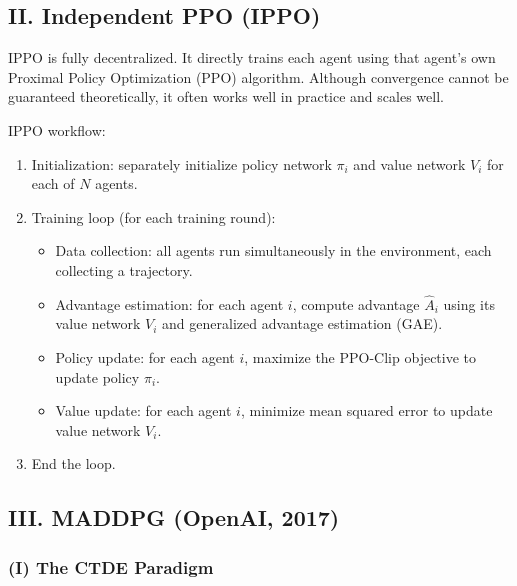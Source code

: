 \hypertarget{ii.-independent-ppo-ippo}{%
\subsection{II. Independent PPO (IPPO)}\label{ii.-independent-ppo-ippo}}

IPPO is fully decentralized. It directly trains each agent using that agent's own Proximal Policy Optimization (PPO) algorithm. Although convergence cannot be guaranteed theoretically, it often works well in practice and scales well.

IPPO workflow:

\begin{enumerate}
\def\labelenumi{\arabic{enumi}.}
\tightlist
\item
  Initialization: separately initialize policy network \(\pi_i\) and value network \(V_i\) for each of \(N\) agents.
\item
{}
  Training loop (for each training round):

  \begin{itemize}
  \tightlist
  \item
    Data collection: all agents run simultaneously in the environment, each collecting a trajectory.
  \item
    Advantage estimation: for each agent \(i\), compute advantage \(\hat{A}_i\) using its value network \(V_i\) and generalized advantage estimation (GAE).
  \item
    Policy update: for each agent \(i\), maximize the PPO-Clip objective to update policy \(\pi_i\).
  \item
    Value update: for each agent \(i\), minimize mean squared error to update value network \(V_i\).
  \end{itemize}
\item
  End the loop.
\end{enumerate}

\hypertarget{iii.-maddpg-openai-2017}{%
\subsection{III. MADDPG (OpenAI, 2017)}\label{iii.-maddpg-openai-2017}}

\hypertarget{i-the-ctde-paradigm}{%
\subsubsection{(I) The CTDE Paradigm}\label{i-the-ctde-paradigm}}

